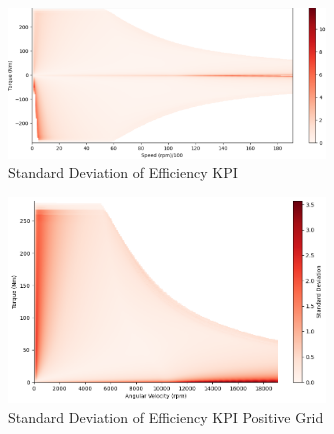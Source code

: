 \documentclass{report} %
\begin{document}
\begin{figure}[H]
    \centering
    \includegraphics[width=0.75\textwidth]{./ReportImages/stddev_y2.png} 
    \caption{Standard Deviation of Efficiency \ac{KPI}} 
    \label{fig:Standard Deviation of 3D KPI(Efficiency)}
\end{figure}

\begin{figure}[H]
    \centering
    \includegraphics[width=0.75\textwidth]{./ReportImages/pos_stddev_y2.png} 
    \caption{Standard Deviation of Efficiency \ac{KPI} Positive Grid} 
    \label{fig:Standard Deviation of 3D KPI(Efficiency) Positive Grid}
\end{figure}
\end{document}
